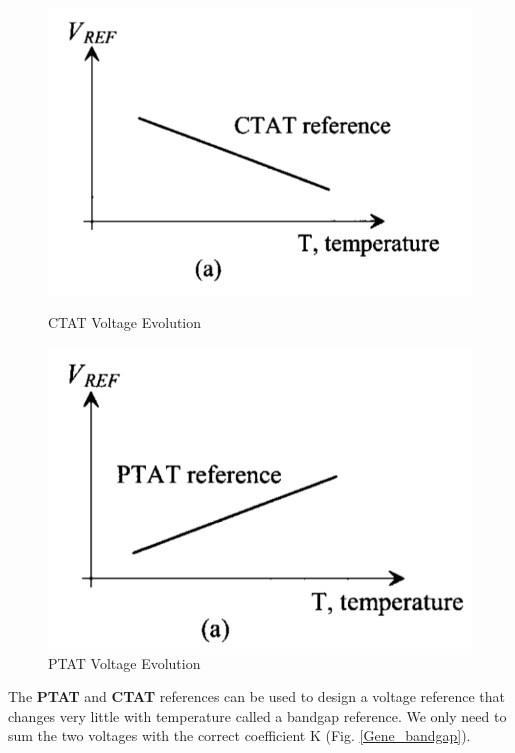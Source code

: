 \documentclass[11pt,a4paper]{report}
\begin{document}
\begin{figure}[h!]
   \begin{minipage}[b]{0.5\linewidth}
      \centering \includegraphics[scale=0.4]{photo/CTAT_crb}
      \caption{CTAT Voltage Evolution}
      \label{CTAT_crb}
   \end{minipage}\hfill
   \begin{minipage}[b]{0.5\linewidth}
      \centering \includegraphics[scale=0.4]{photo/PTAT_crb}
      \caption{PTAT Voltage Evolution}
      \label{ptat_crb}
   \end{minipage}
\end{figure}

\newpage

The \textbf{PTAT} and \textbf{CTAT} references can be used to design a voltage reference that changes very little with temperature called a bandgap reference. We only need to sum the two voltages with the correct coefficient K (Fig. \ref{Gene_bandgap}).
\end{document}
